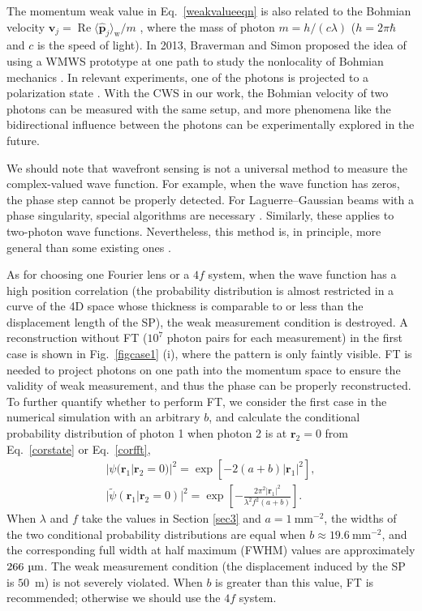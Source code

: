\documentclass[pra,english,reprint,nofootinbib,aps,superscriptaddress,showpacs,showkeys]{revtex4-2}
\theoremstyle{definition}
\theoremstyle{remark}
\begin{document}
	The momentum weak value in Eq.~\eqref{weakvalueeqn} is also related to the Bohmian velocity $\mathbf{v}_j=\operatorname{Re}\langle\hat{\mathbf{p}}_j\rangle_\textrm{w}/m$ \cite{Bohm1,Kocsis2011}, where the mass of photon $m=h/(c\lambda)$ ($h=2\pi\hbar$ and $c$ is the speed of light). In 2013, Braverman and Simon proposed the idea of using a WMWS prototype at one path to study the nonlocality of Bohmian mechanics \cite{Braverman2013}. In relevant experiments, one of the photons is projected to a polarization state \cite{Mahler2016,Xiao2017}. With the CWS in our work, the Bohmian velocity of two photons can be measured with the same setup, and more phenomena like the bidirectional influence between the photons can be experimentally explored in the future.
	
	We should note that wavefront sensing is not a universal method to measure the complex-valued wave function. For example, when the wave function has zeros, the phase step cannot be properly detected. For Laguerre--Gaussian beams with a phase singularity, special algorithms are necessary \cite{Fried2001}. Similarly, these applies to two-photon wave functions. Nevertheless, this method is, in principle, more general than some existing ones \cite{diffract,refint}.
	
	As for choosing one Fourier lens or a $4f$ system, when the wave function has a high position correlation (the probability distribution is almost restricted in a curve of the 4D space whose thickness is comparable to or less than the displacement length of the SP), the weak measurement condition is destroyed. A reconstruction without FT ($10^7$ photon pairs for each measurement) in the first case is shown in Fig.~\ref{figcase1} (i), where the pattern is only faintly visible. FT is needed to project photons on one path into the momentum space to ensure the validity of weak measurement, and thus the phase can be properly reconstructed. To further quantify whether to perform FT, we consider the first case in the numerical simulation with an arbitrary $b$, and calculate the conditional probability distribution of photon 1 when photon 2 is at $\mathbf{r}_2=0$ from Eq.~\eqref{corstate} or Eq.~\eqref{corfft},
	\begin{gather}\label{cidb}
		|\psi(\mathbf{r}_1|\mathbf{r}_2=0)|^2=\exp\left[-2(a+b)|\mathbf{r}_1|^2\right],\nonumber\\
		\big|\tilde{\psi}(\mathbf{r}_1|\mathbf{r}_2=0)\big|^2=\exp\left[-\frac{2\pi^2|\mathbf{r}_1|^2}{\lambda^2f^2(a+b)}\right].
	\end{gather}
	When $\lambda$ and $f$ take the values in Section \ref{sec3} and $a=1~\textrm{mm}^{-2}$, the widths of the two conditional probability distributions are equal when $b\approx19.6~\textrm{mm}^{-2}$, and the corresponding full width at half maximum (FWHM) values are approximately $266~\textrm{\textmu m}$. The weak measurement condition (the displacement induced by the SP is $50$~\textmu m) is not severely violated. When $b$ is greater than this value, FT is recommended; otherwise we should use the $4f$ system.
	
\end{document}
